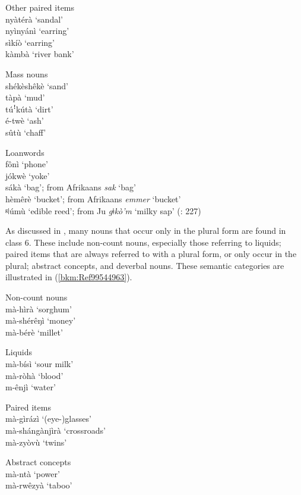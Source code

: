 \ex
  Other paired items \\
  nyàtérà  ‘sandal’\\
      nyìnyánì  ‘earring’\\
      sìkíò    ‘earring’\\
      kàmbà    ‘river bank’

\ex
  Mass nouns  \\
  shékèshêkè  ‘sand’\\
      tàpà    ‘mud’\\
      túꜝkútà  ‘dirt’\\
      é-twè    ‘ash’\\
      sûtù    ‘chaff’

\ex
Loanwords \\
fônì ‘phone’\\
        jókwè    ‘yoke’\\
        sákà    ‘bag’; from Afrikaans \textit{sak} ‘bag’\\
        hèmêrè  ‘bucket’; from Afrikaans \textit{emmer} ‘bucket’ \\        
        ᵍǀúmù ‘edible reed’; from Ju \textit{gǂkò’m} ‘milky sap’ (\citealt{GunninkEtAl2015}: 227)
        \z\z

As discussed in , many nouns that occur only in the plural form are found in class 6. These include non-count nouns, especially those referring to liquids; paired items that are always referred to with a plural form, or only occur in the plural; abstract concepts, and deverbal nouns. These semantic categories are illustrated in (\ref{bkm:Ref99544963}).

\ea
\label{bkm:Ref99544963}
 \ea
Non-count nouns\\  mà-hìrà    ‘sorghum’\\
      mà-shérêŋì    ‘money’\\
      mà-bérè    ‘millet’

\ex
  Liquids  \\
  mà-bísì    ‘sour milk’\\
      mà-ròhà    ‘blood’\\
      m-ênjì    ‘water’

\ex
  Paired items  \\
  mà-gìrázì    ‘(eye-)glasses’\\
      mà-shángànjìrà  ‘crossroads’\\
      mà-zyòvù    ‘twins’

\ex
  Abstract concepts \\
  mà-ntà    ‘power’\\
      mà-rwêzyà    ‘taboo’

